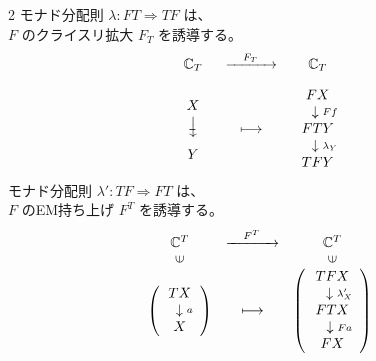 \documentclass[
		head_space=20mm,
		foot_space=20mm,
		gutter=10mm,
		line_length=190mm
]{jlreq}
\begin{document}
\begin{supplement}
	\begin{multicols}{2}
		モナド分配則 $\lambda:FT\Rightarrow TF$ は、\\$F$ のクライスリ拡大 $F_T$ を誘導する。
		\begin{align*}
			\begin{array}{ccc}
				~~\C_T~~ & \xrightarrow{~~~F_T~~~} & \C_T \\[10pt] 
				\substack{\displaystyle X\\[4pt]\rotatebox{-90}{$\!\textstyle\computationlongrightarrow$\;}\\[4pt]\displaystyle Y}  & \longmapsto & \begin{array}{c} FX \\ ~~~ \downarrow \substack{Ff} \\ FTY \\ ~~~\downarrow \substack{\lambda_Y} \\ TFY \end{array}
			\end{array}
		\end{align*}
		モナド分配則 $\lambda':TF\Rightarrow FT$ は、\\$F$ のEM持ち上げ $F^T$ を誘導する。
		\begin{align*}
			\begin{array}{ccc}
			\C^T & \xrightarrow{~~~F^T~~~} & \C^T \\
			\rotatebox{90}{$\in$} && \rotatebox{90}{$\in$} \\
			\substack{\left(\begin{array}{c} TX \\ ~~\downarrow \substack{a} \\ X \end{array}\right)} & \longmapsto & \substack{\left(\begin{array}{c}TFX \\ ~~~\downarrow\substack{\lambda'_X} \\ FTX \\ ~~~\downarrow \substack{Fa} \\ FX \end{array}\right)}
			\end{array}
		\end{align*}
	\end{multicols}
\end{supplement}
\end{document}
